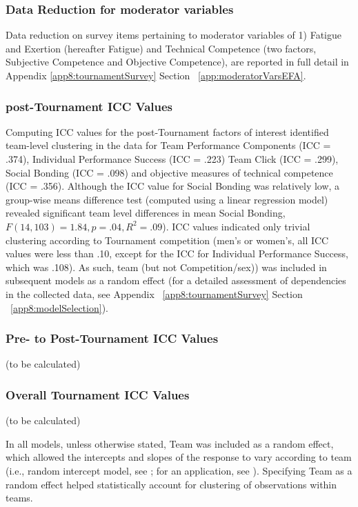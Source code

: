 \begin{CJK}{UTF8}{gbsn}
\subsubsection{Data Reduction for moderator variables}
Data reduction on survey items pertaining to moderator variables of 1) Fatigue and Exertion (hereafter Fatigue) and Technical Competence (two factors, Subjective Competence and Objective Competence), are reported in full detail in Appendix \ref{app8:tournamentSurvey} Section ~\ref{app:moderatorVarsEFA}.






\subsubsection{post-Tournament ICC Values}
Computing ICC values for the post-Tournament factors of interest identified team-level clustering in the data for Team Performance Components (ICC = .374), Individual Performance Success (ICC = .223) Team Click (ICC = .299), Social Bonding (ICC = .098) and objective measures of technical competence (ICC = .356). Although the ICC value for Social Bonding was relatively low, a group-wise means difference test (computed using a linear regression model) revealed significant team level differences in mean Social Bonding, $F(14, 103) = 1.84, p = .04, R^2 = .09$). ICC values indicated only trivial clustering according to Tournament competition (men's or women's, all ICC values were less than .10, except for the ICC for Individual Performance Success, which was .108).  As such, team (but not Competition/sex)) was included in subsequent models as a random effect (for a detailed assessment of dependencies in the collected data, see Appendix ~\ref{app8:tournamentSurvey} Section ~\ref{app8:modelSelection}).


\subsubsection{Pre- to Post-Tournament ICC Values}
(to be calculated)
\subsubsection{Overall Tournament ICC Values}
(to be calculated)





In all models, unless otherwise stated, Team was included as a random effect, which allowed the intercepts and slopes of the response to vary according to team (i.e., random intercept model, see \citep{Pinheiro2000}; for an application, see \citep{Oberauer2006}). Specifying Team as a random effect helped statistically account for clustering of observations within teams.





















\end{CJK}
